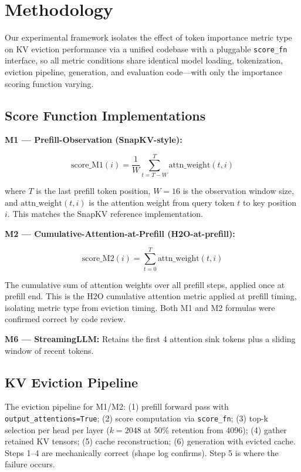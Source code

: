 \section{Methodology}
\label{sec:methodology}

Our experimental framework isolates the effect of token importance metric type on KV eviction performance via a unified codebase with a pluggable \texttt{score\_fn} interface, so all metric conditions share identical model loading, tokenization, eviction pipeline, generation, and evaluation code---with only the importance scoring function varying.

\subsection{Score Function Implementations}

\textbf{M1 --- Prefill-Observation (SnapKV-style):}

\begin{equation}
\text{score\_M1}(i) = \frac{1}{W} \sum_{t=T-W}^{T} \text{attn\_weight}(t, i)
\end{equation}

where $T$ is the last prefill token position, $W=16$ is the observation window size, and $\text{attn\_weight}(t, i)$ is the attention weight from query token $t$ to key position $i$. This matches the SnapKV reference implementation.

\textbf{M2 --- Cumulative-Attention-at-Prefill (H2O-at-prefill):}

\begin{equation}
\text{score\_M2}(i) = \sum_{t=0}^{T} \text{attn\_weight}(t, i)
\end{equation}

The cumulative sum of attention weights over all prefill steps, applied once at prefill end. This is the H2O cumulative attention metric applied at prefill timing, isolating metric type from eviction timing. Both M1 and M2 formulas were confirmed correct by code review.

\textbf{M6 --- StreamingLLM:} Retains the first 4 attention sink tokens plus a sliding window of recent tokens.

\subsection{KV Eviction Pipeline}

The eviction pipeline for M1/M2: (1) prefill forward pass with \texttt{output\_attentions=True}; (2) score computation via \texttt{score\_fn}; (3) top-k selection per head per layer ($k=2048$ at 50\% retention from 4096); (4) gather retained KV tensors; (5) cache reconstruction; (6) generation with evicted cache. Steps 1--4 are mechanically correct (shape log confirms). Step 5 is where the failure occurs.


